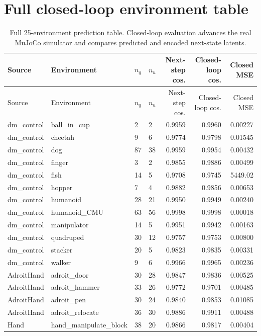 \documentclass[10pt]{article}
\begin{document}
\clearpage
\appendix

\section{Full closed-loop environment table}

\begin{longtable}{llllrrr}
\caption{Full 25-environment prediction table. Closed-loop evaluation advances the real MuJoCo simulator and compares predicted and encoded next-state latents.}\\
\toprule
Source & Environment & $n_q$ & $n_u$ & Next-step cos. & Closed-loop cos. & Closed MSE \\
\midrule
\endfirsthead
\toprule
Source & Environment & $n_q$ & $n_u$ & Next-step cos. & Closed-loop cos. & Closed MSE \\
\midrule
\endhead
\bottomrule
\endfoot
dm\_control & ball\_in\_cup & 2 & 2 & 0.9959 & 0.9960 & 0.00227 \\
dm\_control & cheetah & 9 & 6 & 0.9774 & 0.9798 & 0.01545 \\
dm\_control & dog & 87 & 38 & 0.9959 & 0.9954 & 0.00432 \\
dm\_control & finger & 3 & 2 & 0.9855 & 0.9886 & 0.00499 \\
dm\_control & fish & 14 & 5 & 0.9708 & 0.9745 & 5449.02 \\
dm\_control & hopper & 7 & 4 & 0.9882 & 0.9856 & 0.00653 \\
dm\_control & humanoid & 28 & 21 & 0.9950 & 0.9949 & 0.00240 \\
dm\_control & humanoid\_CMU & 63 & 56 & 0.9998 & 0.9998 & 0.00018 \\
dm\_control & manipulator & 14 & 5 & 0.9951 & 0.9942 & 0.00163 \\
dm\_control & quadruped & 30 & 12 & 0.9757 & 0.9753 & 0.00800 \\
dm\_control & stacker & 20 & 5 & 0.9823 & 0.9835 & 0.00331 \\
dm\_control & walker & 9 & 6 & 0.9966 & 0.9965 & 0.00236 \\
AdroitHand & adroit\_door & 30 & 28 & 0.9847 & 0.9836 & 0.00525 \\
AdroitHand & adroit\_hammer & 33 & 26 & 0.9772 & 0.9701 & 0.00485 \\
AdroitHand & adroit\_pen & 30 & 24 & 0.9840 & 0.9853 & 0.01085 \\
AdroitHand & adroit\_relocate & 36 & 30 & 0.9886 & 0.9911 & 0.00488 \\
Hand & hand\_manipulate\_block & 38 & 20 & 0.9866 & 0.9817 & 0.00404 \\

\end{longtable}
\end{document}

